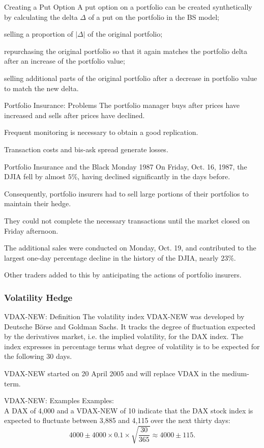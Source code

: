 Creating a Put Option
	A put option on a portfolio can be created synthetically by
		calculating the delta $\Delta$ of a put on the portfolio in the BS model;
		
		selling a proportion of $\vert \Delta \vert$ of the original portfolio;
		
		repurchasing the original portfolio so that it again matches the
		portfolio delta after an increase of the portfolio value;
		
		selling additional parts of the original portfolio after a decrease in
		portfolio value to match the new delta.


Portfolio Insurance: Problems
	The portfolio manager buys after prices have increased and sells after
  prices have declined.
   
	Frequent monitoring is necessary to obtain a good replication.
   
	Transaction costs and bis-ask spread generate losses.


Portfolio Insurance and the Black Monday 1987
	On Friday, Oct. 16, 1987, the DJIA fell by almost $5\%$, having declined
  significantly in the days before.
   
	Consequently, portfolio insurers had to sell large portions of their
  portfolios to maintain their hedge. 
   
	They could not complete the necessary transactions until the market
  closed on Friday afternoon.
   
	The additional sales were conducted on Monday, Oct. 19, and contributed
  to the largest one-day percentage decline in the history of the DJIA, nearly
  $23\%$.
   
	Other traders added to this by anticipating the actions of portfolio
  insurers.


\subsubsection{Volatility Hedge}

VDAX-NEW: Definition
	The volatility index VDAX-NEW was developed by Deutsche B{\"o}rse and Goldman Sachs. 
	It tracks the degree of fluctuation expected by the derivatives market, i.e. the implied 
	volatility, for the DAX index. The index expresses in percentage terms what degree of volatility 
	is to be expected for the following 30 days.
   
	VDAX-NEW started on 20 April 2005 and will replace VDAX in the medium-term.


VDAX-NEW: Examples
	Examples:\\
		A DAX of 4,000 and a VDAX-NEW of 10 indicate that the DAX stock index is expected to fluctuate 
		between 3,885 and 4,115 over the next thirty days:
		$$4000\pm4000\times0.1\times\sqrt{\frac{30}{365}}\approx4000\pm115.$$
		
